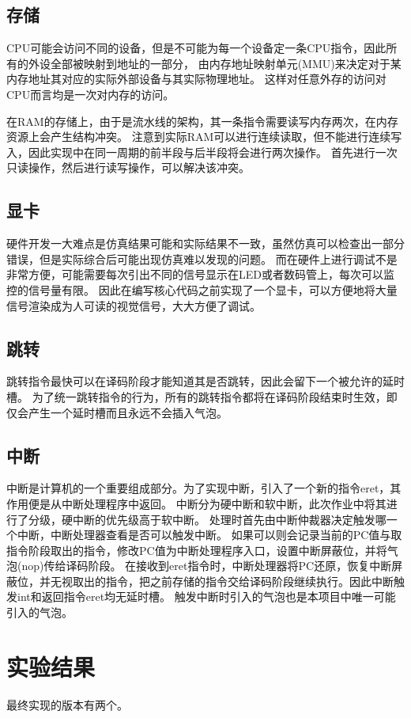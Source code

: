   \subsection{存储}
    CPU可能会访问不同的设备，但是不可能为每一个设备定一条CPU指令，因此所有的外设全部被映射到地址的一部分，
    由内存地址映射单元(MMU)来决定对于某内存地址其对应的实际外部设备与其实际物理地址。
    这样对任意外存的访问对CPU而言均是一次对内存的访问。

    在RAM的存储上，由于是流水线的架构，其一条指令需要读写内存两次，在内存资源上会产生结构冲突。
    注意到实际RAM可以进行连续读取，但不能进行连续写入，因此实现中在同一周期的前半段与后半段将会进行两次操作。
    首先进行一次只读操作，然后进行读写操作，可以解决该冲突。
  \subsection{显卡}
    硬件开发一大难点是仿真结果可能和实际结果不一致，虽然仿真可以检查出一部分错误，但是实际综合后可能出现仿真难以发现的问题。
    而在硬件上进行调试不是非常方便，可能需要每次引出不同的信号显示在LED或者数码管上，每次可以监控的信号量有限。
    因此在编写核心代码之前实现了一个显卡，可以方便地将大量信号渲染成为人可读的视觉信号，大大方便了调试。
  \subsection{跳转}
    跳转指令最快可以在译码阶段才能知道其是否跳转，因此会留下一个被允许的延时槽。
    为了统一跳转指令的行为，所有的跳转指令都将在译码阶段结束时生效，即仅会产生一个延时槽而且永远不会插入气泡。
  \subsection{中断}
    中断是计算机的一个重要组成部分。为了实现中断，引入了一个新的指令eret，其作用便是从中断处理程序中返回。
    中断分为硬中断和软中断，此次作业中将其进行了分级，硬中断的优先级高于软中断。
    处理时首先由中断仲裁器决定触发哪一个中断，中断处理器查看是否可以触发中断。
    如果可以则会记录当前的PC值与取指令阶段取出的指令，修改PC值为中断处理程序入口，设置中断屏蔽位，并将气泡(nop)传给译码阶段。
    在接收到eret指令时，中断处理器将PC还原，恢复中断屏蔽位，并无视取出的指令，把之前存储的指令交给译码阶段继续执行。因此中断触发int和返回指令eret均无延时槽。
    触发中断时引入的气泡也是本项目中唯一可能引入的气泡。

\section{实验结果}
  最终实现的版本有两个。
